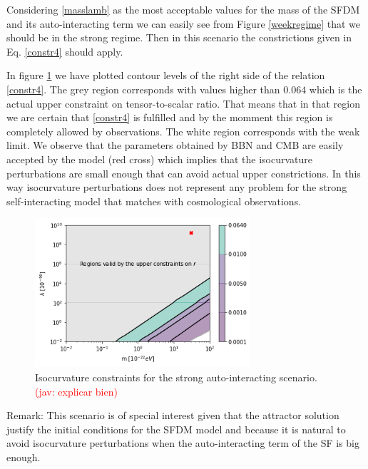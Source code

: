 \documentclass[amssymb,twocolumn,prd,nofootinbib,showpacs]{revtex4-1}
\newcommand{\jav}[1]{\textcolor{red}{(jav: #1)}}
\begin{document}
Considering \eqref{masslamb} as the most acceptable values for the mass of the SFDM and 
its auto-interacting term we can easily see from Figure \ref{weekregime} that we should be in the strong regime. 
Then in this scenario the constrictions given in Eq. \eqref{constr4} should apply. 

In figure \ref{constraintsSFDMls} we have plotted contour levels of the right side of the relation \eqref{constr4}. The grey region corresponds with values higher than $0.064$ which is the actual upper constraint on tensor-to-scalar ratio. That means that in that region we are certain that \eqref{constr4} is fulfilled and by the momment this region is completely allowed by observations. The white region corresponds with the weak limit. We observe that the parameters obtained by BBN and CMB are easily accepted by the model (red cross) which implies that the isocurvature perturbations are small enough that can avoid actual upper 
constrictions. In this way isocurvature perturbations does not represent any problem for the strong 
self-interacting model that matches with cosmological observations.
%
\begin{figure}
\includegraphics[width=8cm]{stronglamb.png}
\caption{Isocurvature constraints for the strong auto-interacting scenario.
\jav{explicar bien}}\label{constraintsSFDMls}
\end{figure} 

Remark: This scenario is of special interest given that the attractor solution justify the initial 
conditions for the SFDM model and because it is natural to avoid isocurvature perturbations 
when the auto-interacting term of the SF is big enough.
 
\end{document}
